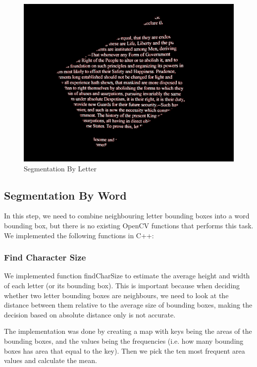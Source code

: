 \documentclass[conference]{IEEEtran}
\begin{document}
\begin{figure}
\center
\includegraphics[scale=0.10]{letter_with_bounding_box.jpg}
\caption{Segmentation By Letter}
\label{letterbbox}
\end{figure}

\subsection{Segmentation By Word}

In this step, we need to combine neighbouring letter bounding boxes into a word bounding box, but there is no existing OpenCV functions that performs this task.  We implemented the following functions in C++:

\subsubsection{Find Character Size}
We implemented function findCharSize to estimate the average height and width of each letter (or its bounding box).  This is important because when deciding whether two letter bounding boxes are neighbours, we need to look at the distance between them relative to the average size of bounding boxes, making the decision based on absolute distance only is not accurate.

The implementation was done by creating a map with keys being the areas of the bounding boxes, and the values being the frequencies (i.e. how many bounding boxes has area that equal to the key).  Then we pick the ten most frequent area values and calculate the mean.
\end{document}
